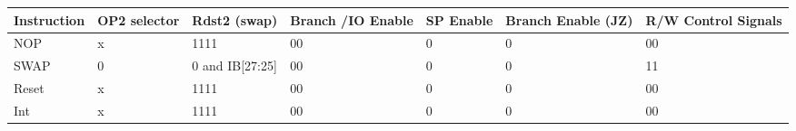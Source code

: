 \begin{center}
\begin{tabular}{||p{20mm}| p{15mm}| p{15mm}| p{15mm}| p{15mm}| p{15mm}| p{15mm}||} 
\hline
Instruction & OP2 selector & Rdst2 (swap) & Branch /IO Enable & SP Enable & Branch Enable (JZ) & R/W Control Signals  \\ [0.5ex] 
\hline\hline
NOP & x & 1111 & 00 & 0 & 0 & 00 \\
\hline
SWAP & 0 & 0 and IB[27:25] & 00 & 0 & 0 & 11 \\
\hline
Reset & x & 1111 & 00 & 0 & 0 & 00 \\
\hline
Int & x & 1111 & 00 & 0 & 0 & 00 \\
\hline
\end{tabular}
\end{center}